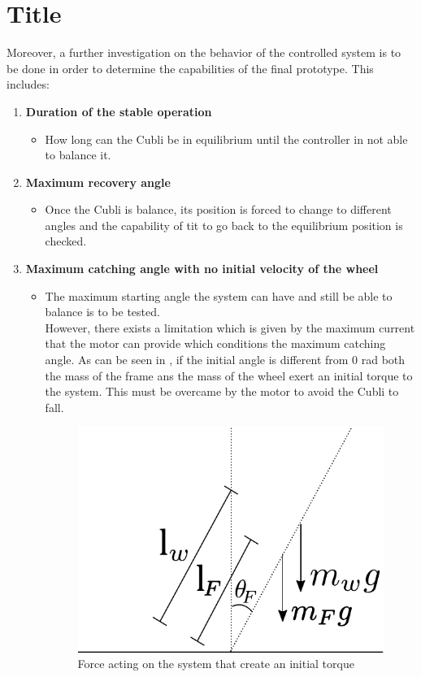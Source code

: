 \section{Title}\label{title}
Moreover, a further investigation on the behavior of the controlled system is to be done in order to determine the capabilities of the final prototype. This includes:
\begin{enumerate}
\item \textbf{Duration of the stable operation}
	\begin{itemize}
	\item[] How long can the Cubli be in equilibrium until the controller in not able to balance it.
	\end{itemize}

	\item \textbf{Maximum recovery angle}
	\begin{itemize}
		\item[] Once the Cubli is balance, its position is forced to change to different angles and the capability of tit to go back to the equilibrium position is checked. 
	\end{itemize}
	
	\item \textbf{Maximum catching angle with no initial velocity of the wheel}
	\begin{itemize}
		\item[] The maximum starting angle the system can have and still be able to balance is to be tested.\\
		However, there exists a limitation which is given by the maximum current that the motor can provide which conditions the maximum catching angle. As can be seen in , if the initial angle is different from 0 rad both the mass of the frame ans the mass of the wheel exert an initial torque to the system. This must be overcame by the motor to avoid the Cubli to fall.
		\begin{figure}[H] 
			\centering
			\includegraphics[scale=0.65]{figures/limitationTorque}
			\caption{Force acting on the system that create an initial torque}
			\label{limitationTorque}
		\end{figure}
		

\end{itemize}
\end{enumerate}
